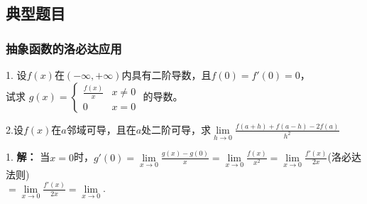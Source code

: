 \documentclass[12pt , a4paper , oneside]{ctexart}
\begin{document}
        \subsection{典型题目}
            \subsubsection{抽象函数的洛必达应用}
            1. 设$f(x)$在$(-\infty , +\infty)$内具有二阶导数，且$f(0)=f'(0)=0$，\\试求
            $g(x)=\begin{cases}
                \frac{f(x)}{x} & x \neq 0\\
                0 & x = 0
            \end{cases}$
            的导数。

            2.设$f(x)$在$a$邻域可导，且在$a$处二阶可导，求$
            \lim\limits_{h \to 0}\frac{f(a+h)+f(a-h)-2f(a)}{h^2}$

            \begin{mdframed}
            1. \textbf{解：}
            当$x = 0$时，$g'(0) = \lim\limits_{x \to 0} \frac{g(x) - g(0)}{x} = 
            \lim\limits_{x \to 0} \frac{f(x)}{x^2} = \lim\limits_{x \to 0} \frac{f'(x)}{2x}$(洛必达法则)\\
            $= \lim\limits_{x \to 0} \frac{f'(x)}{2x} = \lim\limits_{x \to 0} $.
            \end{mdframed}
\end{document}
